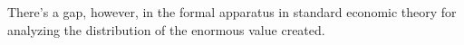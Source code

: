 






There's a gap, however, in the formal apparatus in standard economic theory for analyzing the distribution of the enormous value created. 


